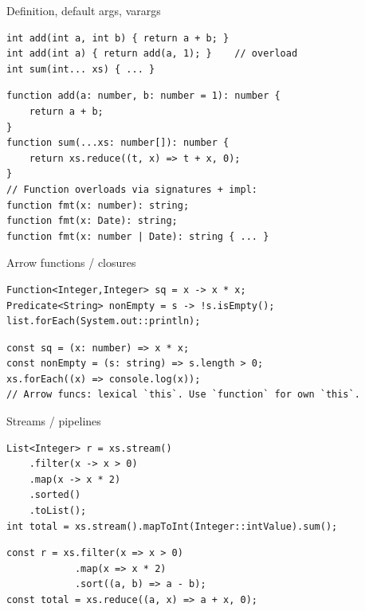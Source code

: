 \documentclass[10pt]{article}
\begin{document}
\begin{construct}{Definition, default args, varargs}
\noindent
\begin{minipage}[t]{0.485\linewidth}
\begin{lstlisting}[style=java, title=Java]
int add(int a, int b) { return a + b; }
int add(int a) { return add(a, 1); }    // overload
int sum(int... xs) { ... }
\end{lstlisting}
\end{minipage}\hfill
\begin{minipage}[t]{0.485\linewidth}
\begin{lstlisting}[style=ts, title=TypeScript]
function add(a: number, b: number = 1): number {
    return a + b;
}
function sum(...xs: number[]): number {
    return xs.reduce((t, x) => t + x, 0);
}
// Function overloads via signatures + impl:
function fmt(x: number): string;
function fmt(x: Date): string;
function fmt(x: number | Date): string { ... }
\end{lstlisting}
\end{minipage}
\end{construct}

\begin{construct}{Arrow functions / closures}
\noindent
\begin{minipage}[t]{0.485\linewidth}
\begin{lstlisting}[style=java, title=Java]
Function<Integer,Integer> sq = x -> x * x;
Predicate<String> nonEmpty = s -> !s.isEmpty();
list.forEach(System.out::println);
\end{lstlisting}
\end{minipage}\hfill
\begin{minipage}[t]{0.485\linewidth}
\begin{lstlisting}[style=ts, title=TypeScript]
const sq = (x: number) => x * x;
const nonEmpty = (s: string) => s.length > 0;
xs.forEach((x) => console.log(x));
// Arrow funcs: lexical `this`. Use `function` for own `this`.
\end{lstlisting}
\end{minipage}
\end{construct}

\begin{construct}{Streams / pipelines}
\noindent
\begin{minipage}[t]{0.485\linewidth}
\begin{lstlisting}[style=java, title=Java]
List<Integer> r = xs.stream()
    .filter(x -> x > 0)
    .map(x -> x * 2)
    .sorted()
    .toList();
int total = xs.stream().mapToInt(Integer::intValue).sum();
\end{lstlisting}
\end{minipage}\hfill
\begin{minipage}[t]{0.485\linewidth}
\begin{lstlisting}[style=ts, title=TypeScript]
const r = xs.filter(x => x > 0)
            .map(x => x * 2)
            .sort((a, b) => a - b);
const total = xs.reduce((a, x) => a + x, 0);
\end{lstlisting}
\end{minipage}
\end{construct}
\end{document}
